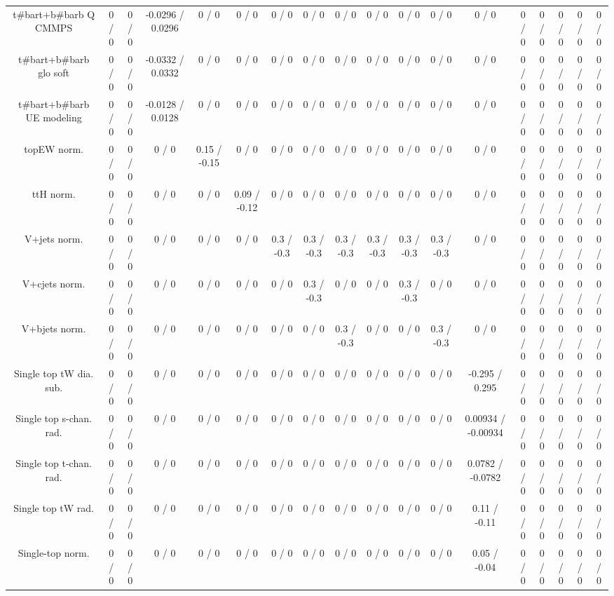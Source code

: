 \documentclass[10pt]{article}
\begin{document}
\begin{table}[htbp]
\begin{center}
\begin{tabular}{|c|c|c|c|c|c|c|c|c|c|c|c|c|c|c|c|c|c|}
  t#bar{t}+b#bar{b} Q CMMPS & 0 / 0 & 0 / 0 & -0.0296 / 0.0296 & 0 / 0 & 0 / 0 & 0 / 0 & 0 / 0 & 0 / 0 & 0 / 0 & 0 / 0 & 0 / 0 & 0 / 0 & 0 / 0 & 0 / 0 & 0 / 0 & 0 / 0 & 0 / 0 \\ 
  t#bar{t}+b#bar{b} glo soft & 0 / 0 & 0 / 0 & -0.0332 / 0.0332 & 0 / 0 & 0 / 0 & 0 / 0 & 0 / 0 & 0 / 0 & 0 / 0 & 0 / 0 & 0 / 0 & 0 / 0 & 0 / 0 & 0 / 0 & 0 / 0 & 0 / 0 & 0 / 0 \\ 
  t#bar{t}+b#bar{b} UE modeling & 0 / 0 & 0 / 0 & -0.0128 / 0.0128 & 0 / 0 & 0 / 0 & 0 / 0 & 0 / 0 & 0 / 0 & 0 / 0 & 0 / 0 & 0 / 0 & 0 / 0 & 0 / 0 & 0 / 0 & 0 / 0 & 0 / 0 & 0 / 0 \\ 
  topEW norm. & 0 / 0 & 0 / 0 & 0 / 0 & 0.15 / -0.15 & 0 / 0 & 0 / 0 & 0 / 0 & 0 / 0 & 0 / 0 & 0 / 0 & 0 / 0 & 0 / 0 & 0 / 0 & 0 / 0 & 0 / 0 & 0 / 0 & 0 / 0 \\ 
  ttH norm. & 0 / 0 & 0 / 0 & 0 / 0 & 0 / 0 & 0.09 / -0.12 & 0 / 0 & 0 / 0 & 0 / 0 & 0 / 0 & 0 / 0 & 0 / 0 & 0 / 0 & 0 / 0 & 0 / 0 & 0 / 0 & 0 / 0 & 0 / 0 \\ 
  V+jets norm. & 0 / 0 & 0 / 0 & 0 / 0 & 0 / 0 & 0 / 0 & 0.3 / -0.3 & 0.3 / -0.3 & 0.3 / -0.3 & 0.3 / -0.3 & 0.3 / -0.3 & 0.3 / -0.3 & 0 / 0 & 0 / 0 & 0 / 0 & 0 / 0 & 0 / 0 & 0 / 0 \\ 
  V+cjets norm. & 0 / 0 & 0 / 0 & 0 / 0 & 0 / 0 & 0 / 0 & 0 / 0 & 0.3 / -0.3 & 0 / 0 & 0 / 0 & 0.3 / -0.3 & 0 / 0 & 0 / 0 & 0 / 0 & 0 / 0 & 0 / 0 & 0 / 0 & 0 / 0 \\ 
  V+bjets norm. & 0 / 0 & 0 / 0 & 0 / 0 & 0 / 0 & 0 / 0 & 0 / 0 & 0 / 0 & 0.3 / -0.3 & 0 / 0 & 0 / 0 & 0.3 / -0.3 & 0 / 0 & 0 / 0 & 0 / 0 & 0 / 0 & 0 / 0 & 0 / 0 \\ 
  Single top tW dia. sub. & 0 / 0 & 0 / 0 & 0 / 0 & 0 / 0 & 0 / 0 & 0 / 0 & 0 / 0 & 0 / 0 & 0 / 0 & 0 / 0 & 0 / 0 & -0.295 / 0.295 & 0 / 0 & 0 / 0 & 0 / 0 & 0 / 0 & 0 / 0 \\ 
  Single top s-chan. rad. & 0 / 0 & 0 / 0 & 0 / 0 & 0 / 0 & 0 / 0 & 0 / 0 & 0 / 0 & 0 / 0 & 0 / 0 & 0 / 0 & 0 / 0 & 0.00934 / -0.00934 & 0 / 0 & 0 / 0 & 0 / 0 & 0 / 0 & 0 / 0 \\ 
  Single top t-chan. rad. & 0 / 0 & 0 / 0 & 0 / 0 & 0 / 0 & 0 / 0 & 0 / 0 & 0 / 0 & 0 / 0 & 0 / 0 & 0 / 0 & 0 / 0 & 0.0782 / -0.0782 & 0 / 0 & 0 / 0 & 0 / 0 & 0 / 0 & 0 / 0 \\ 
  Single top tW rad. & 0 / 0 & 0 / 0 & 0 / 0 & 0 / 0 & 0 / 0 & 0 / 0 & 0 / 0 & 0 / 0 & 0 / 0 & 0 / 0 & 0 / 0 & 0.11 / -0.11 & 0 / 0 & 0 / 0 & 0 / 0 & 0 / 0 & 0 / 0 \\ 
  Single-top norm. & 0 / 0 & 0 / 0 & 0 / 0 & 0 / 0 & 0 / 0 & 0 / 0 & 0 / 0 & 0 / 0 & 0 / 0 & 0 / 0 & 0 / 0 & 0.05 / -0.04 & 0 / 0 & 0 / 0 & 0 / 0 & 0 / 0 & 0 / 0 \\ 

\end{tabular}
\end{center}
\end{table}
\end{document}

